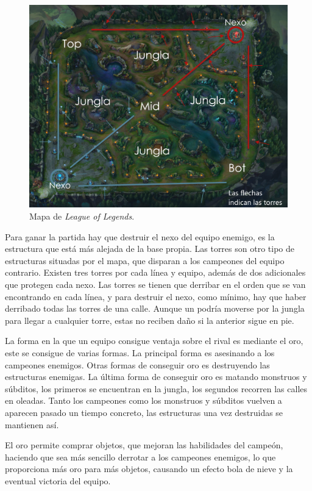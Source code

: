 \begin{figure}
	\centering
	\includegraphics[width=1\linewidth]{img/mapa-lol}
	\caption{Mapa de \textit{League of Legends}.}
	\label{fig:mapa-lol}
\end{figure}

Para ganar la partida hay que destruir el nexo del equipo enemigo, es la estructura que está más alejada de la base propia. Las torres son otro tipo de estructuras situadas por el mapa, que disparan a los campeones del equipo contrario. Existen tres torres por cada línea y equipo, además de dos adicionales que protegen cada nexo. Las torres se tienen que derribar en el orden que se van encontrando en cada línea, y para destruir el nexo, como mínimo, hay que haber derribado todas las torres de una calle. Aunque un podría moverse por la jungla para llegar a cualquier torre, estas no reciben daño si la anterior sigue en pie.

La forma en la que un equipo consigue ventaja sobre el rival es mediante el oro, este se consigue de varias formas. La principal forma es asesinando a los campeones enemigos. Otras formas de conseguir oro es destruyendo las estructuras enemigas. La última forma de conseguir oro es matando monstruos y súbditos, los primeros se encuentran en la jungla, los segundos recorren las calles en oleadas. Tanto los campeones como los monstruos y súbditos vuelven a aparecen pasado un tiempo concreto, las estructuras una vez destruidas se mantienen así.

El oro permite comprar objetos, que mejoran las habilidades del campeón, haciendo que sea más sencillo derrotar a los campeones enemigos, lo que proporciona más oro para más objetos, causando un efecto bola de nieve y la eventual victoria del equipo.

